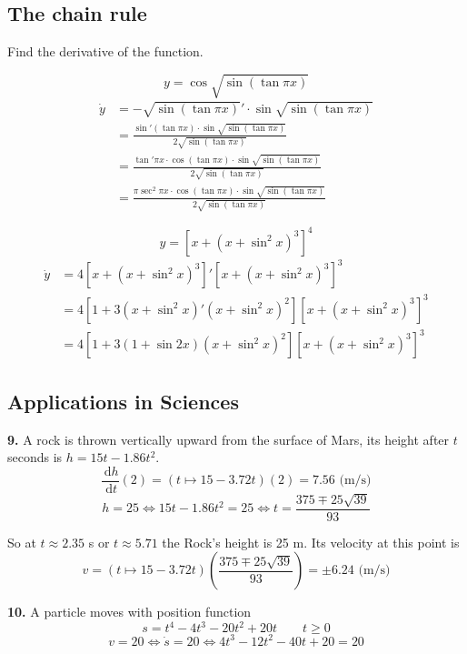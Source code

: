 \documentclass[a4paper,12pt]{article}
\newcommand{\ud}{\,\mathrm{d}}
\begin{document}
\subsection{The chain rule}
Find the derivative of the function.

\[y = \cos\sqrt{\sin(\tan{\pi x})}\tag{45}\]
\begin{align*}
\dot{y} &= -\sqrt{\sin(\tan{\pi x})}' \cdot \sin\sqrt{\sin(\tan{\pi x})}\\
        &= \frac{\sin'(\tan{\pi x}) \cdot \sin\sqrt{\sin(\tan{\pi x})}}
                {2\sqrt{\sin(\tan{\pi x})}}\\
        &= \frac{\tan'{\pi x} \cdot \cos(\tan{\pi x})
                 \cdot \sin\sqrt{\sin(\tan{\pi x})}}
                {2\sqrt{\sin(\tan{\pi x})}}\\
        &= \frac{\pi\sec^2{\pi x} \cdot \cos(\tan{\pi x})
                 \cdot \sin\sqrt{\sin(\tan{\pi x})}}
                {2\sqrt{\sin(\tan{\pi x})}}
\end{align*}

\[y = [x + (x + \sin^2{x})^3]^4 \tag{46}\]
\begin{align*}
\dot{y} &= 4[x + (x + \sin^2{x})^3]' [x + (x + \sin^2{x})^3]^3\\
        &= 4[1 + 3(x + \sin^2{x})' (x + \sin^2{x})^2]
            [x + (x + \sin^2{x})^3]^3\\
        &= 4[1 + 3(1 + \sin{2x})(x + \sin^2{x})^2]
            [x + (x + \sin^2{x})^3]^3
\end{align*}

\setcounter{subsection}{6}
\subsection{Applications in Sciences}
\textbf{9. }A rock is thrown vertically upward from the surface of Mars, its
height after $t$ seconds is $h = 15t - 1.86t^2$.
\[\frac{\ud h}{\ud t}(2)
= (t \mapsto 15 - 3.72t)(2)
= 7.56\text{ (m/s)}\tag{a}\]
\[h = 25 \iff 15t - 1.86t^2 = 25
  \iff t = \frac{375 \mp 25\sqrt{39}}{93}\tag{b}\]

So at $t \approx 2.35$ s or $t \approx 5.71$ the Rock's height is 25 m. Its
velocity at this point is
\[v = (t \mapsto 15 - 3.72t)\left(\frac{375 \mp 25\sqrt{39}}{93}\right)
    = \pm 6.24\text{ (m/s)}\]

\pagebreak\noindent\textbf{10. }A particle moves with position function
\[s = t^4 - 4t^3 - 20t^2 + 20t \qquad t \geq 0\]
\[v = 20 \iff \dot{s} = 20 \iff 4t^3 - 12t^2 - 40t + 20 = 20 \tag{a}\]
\end{document}
